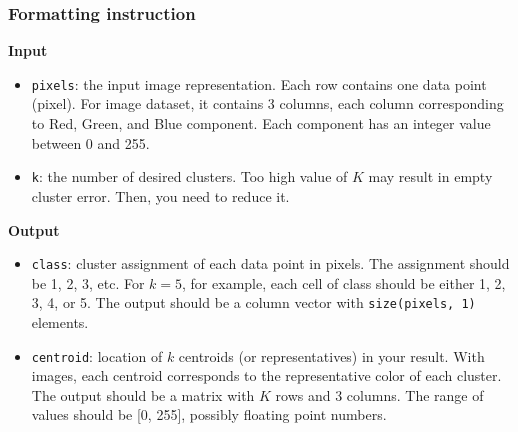 \documentclass[twoside,10pt]{article}
\begin{document}
\subsubsection*{Formatting instruction}


\textbf{Input}
\begin{itemize}
  \item \texttt{pixels}: the input image representation. Each row contains one data point (pixel). For image dataset, it contains 3 columns, each column corresponding to Red, Green, and Blue component. Each component has an integer value between 0 and 255.
  \item \texttt{k}: the number of desired clusters. Too high value of $K$ may result in empty cluster error. Then, you need to reduce it.
\end{itemize}

\textbf{Output}
\begin{itemize}
  \item \texttt{class}: cluster assignment of each data point in pixels. The assignment should be 1, 2, 3, etc. For $k = 5$, for example, each cell of class should be either 1, 2, 3, 4, or 5. The output should be a column vector with \texttt{size(pixels, 1)} elements.
  \item \texttt{centroid}: location of $k$ centroids (or representatives) in your result. With images, each centroid corresponds to the representative color of each cluster. The output should be a matrix with $K$ rows and 3 columns. The range of values should be [0, 255], possibly floating point numbers.
\end{itemize}
\end{document}
